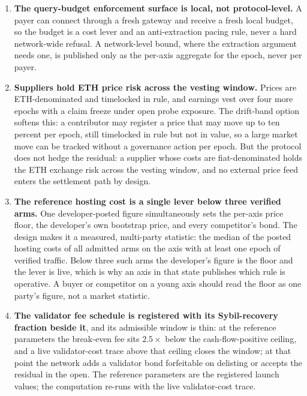 \documentclass[11pt]{article}
\begin{document}
\begin{enumerate}
          one; only a per-query flat meter would remove that, and it would
          price short clips out.
    \item \textbf{The query-budget enforcement surface is local, not
              protocol-level.} A payer can connect through a fresh gateway and
          receive a fresh local budget, so the budget is a cost lever and
          an anti-extraction pacing rule, never a hard network-wide
          refusal. A network-level bound, where the extraction argument
          needs one, is published only as the per-axis aggregate for the
          epoch, never per payer.
    \item \textbf{Suppliers hold ETH price risk across the vesting
              window.} Prices are ETH-denominated and timelocked in rule, and
          earnings vest over four more epochs with a claim freeze under
          open probe exposure. The drift-band option softens this: a
          contributor may register a price that may move up to ten percent
          per epoch, still timelocked in rule but not in value, so a large
          market move can be tracked without a governance action per
          epoch. But the protocol does not hedge the residual: a
          supplier whose costs are fiat-denominated holds the ETH exchange
          risk across the vesting window, and no external price feed
          enters the settlement path by design.
    \item \textbf{The reference hosting cost is a single lever below
              three verified arms.} One developer-posted figure simultaneously
          sets the per-axis price floor, the developer's own bootstrap
          price, and every competitor's bond. The design makes it a
          measured, multi-party statistic: the median of the posted
          hosting costs of all admitted arms on the axis with at least one
          epoch of verified traffic. Below three such arms the developer's
          figure is the floor and the lever is live, which is why an axis
          in that state publishes which rule is operative. A buyer or
          competitor on a young axis should read the floor as one party's
          figure, not a market statistic.
    \item \textbf{The validator fee schedule is registered with its
              Sybil-recovery fraction beside it}, and its admissible window is
          thin: at the reference parameters the break-even fee sits
          $2.5\times$ below the cash-flow-positive ceiling, and a live
          validator-cost trace above that ceiling closes the window; at
          that point the network adds a validator bond forfeitable on
          delisting or accepts the residual in the open. The reference
          parameters are the registered launch values; the computation
          re-runs with the live validator-cost trace.
\end{enumerate}
\end{document}
